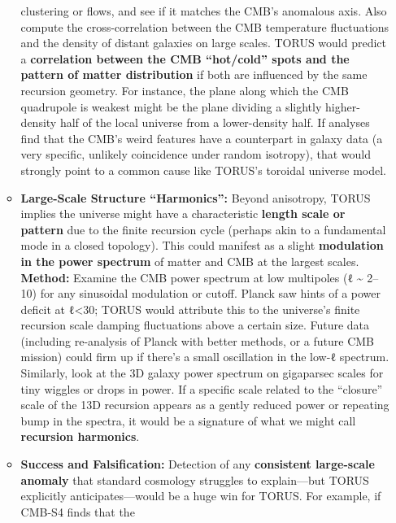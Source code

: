 \documentclass[
]{article}
\begin{document}
\begin{itemize}
\begin{itemize}
    clustering or flows, and see if it matches the CMB's anomalous axis.
    Also compute the cross-correlation between the CMB temperature
    fluctuations and the density of distant galaxies on large scales.
    TORUS would predict a \textbf{correlation between the CMB
    ``hot/cold'' spots and the pattern of matter distribution} if both
    are influenced by the same recursion geometry\hspace{0pt}. For
    instance, the plane along which the CMB quadrupole is weakest might
    be the plane dividing a slightly higher-density half of the local
    universe from a lower-density half\hspace{0pt}. If analyses find
    that the CMB's weird features have a counterpart in galaxy data (a
    very specific, unlikely coincidence under random isotropy), that
    would strongly point to a common cause like TORUS's toroidal
    universe model\hspace{0pt}.
  \item
    \textbf{Large-Scale Structure ``Harmonics'':} Beyond anisotropy,
    TORUS implies the universe might have a characteristic
    \textbf{length scale or pattern} due to the finite recursion cycle
    (perhaps akin to a fundamental mode in a closed topology). This
    could manifest as a slight \textbf{modulation in the power spectrum}
    of matter and CMB at the largest scales. \textbf{Method:} Examine
    the CMB power spectrum at low multipoles (ℓ \textasciitilde{} 2--10)
    for any sinusoidal modulation or cutoff. Planck saw hints of a power
    deficit at ℓ\textless30; TORUS would attribute this to the
    universe's finite recursion scale damping fluctuations above a
    certain size\hspace{0pt}. Future data (including re-analysis of
    Planck with better methods, or a future CMB mission) could firm up
    if there's a small oscillation in the low-ℓ spectrum. Similarly,
    look at the 3D galaxy power spectrum on gigaparsec scales for tiny
    wiggles or drops in power. If a specific scale related to the
    ``closure'' scale of the 13D recursion appears as a gently reduced
    power or repeating bump in the spectra, it would be a signature of
    what we might call \textbf{recursion harmonics}\hspace{0pt}.
  \item
    \textbf{Success and Falsification:} Detection of any
    \textbf{consistent large-scale anomaly} that standard cosmology
    struggles to explain---but TORUS explicitly anticipates---would be a
    huge win for TORUS. For example, if CMB-S4 finds that the

\end{itemize}
\end{itemize}
\end{document}
